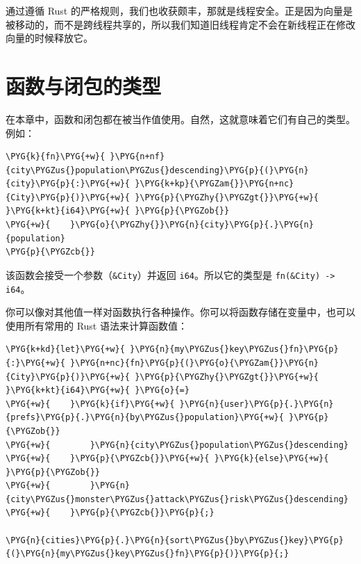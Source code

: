 通过遵循 Rust 的严格规则，我们也收获颇丰，那就是线程安全。正是因为向量是被移动的，而不是跨线程共享的，所以我们知道旧线程肯定不会在新线程正在修改向量的时候释放它。

\section{函数与闭包的类型}

在本章中，函数和闭包都在被当作值使用。自然，这就意味着它们有自己的类型。例如：

\begin{Verbatim}[commandchars=\\\{\},breaklines=true,breakanywhere=true,fontsize=\codefont,xleftmargin=17bp]
\PYG{k}{fn}\PYG{+w}{ }\PYG{n+nf}{city\PYGZus{}population\PYGZus{}descending}\PYG{p}{(}\PYG{n}{city}\PYG{p}{:}\PYG{+w}{ }\PYG{k+kp}{\PYGZam{}}\PYG{n+nc}{City}\PYG{p}{)}\PYG{+w}{ }\PYG{p}{\PYGZhy{}\PYGZgt{}}\PYG{+w}{ }\PYG{k+kt}{i64}\PYG{+w}{ }\PYG{p}{\PYGZob{}}
\PYG{+w}{    }\PYG{o}{\PYGZhy{}}\PYG{n}{city}\PYG{p}{.}\PYG{n}{population}
\PYG{p}{\PYGZcb{}}
\end{Verbatim}

该函数会接受一个参数（\texttt{\&City}）并返回 \texttt{i64}。所以它的类型是 \texttt{fn(\&City) -> i64}。

你可以像对其他值一样对函数执行各种操作。你可以将函数存储在变量中，也可以使用所有常用的 Rust 语法来计算函数值：

\begin{Verbatim}[commandchars=\\\{\},breaklines=true,breakanywhere=true,fontsize=\codefont,xleftmargin=17bp]
\PYG{k+kd}{let}\PYG{+w}{ }\PYG{n}{my\PYGZus{}key\PYGZus{}fn}\PYG{p}{:}\PYG{+w}{ }\PYG{n+nc}{fn}\PYG{p}{(}\PYG{o}{\PYGZam{}}\PYG{n}{City}\PYG{p}{)}\PYG{+w}{ }\PYG{p}{\PYGZhy{}\PYGZgt{}}\PYG{+w}{ }\PYG{k+kt}{i64}\PYG{+w}{ }\PYG{o}{=}
\PYG{+w}{    }\PYG{k}{if}\PYG{+w}{ }\PYG{n}{user}\PYG{p}{.}\PYG{n}{prefs}\PYG{p}{.}\PYG{n}{by\PYGZus{}population}\PYG{+w}{ }\PYG{p}{\PYGZob{}}
\PYG{+w}{        }\PYG{n}{city\PYGZus{}population\PYGZus{}descending}
\PYG{+w}{    }\PYG{p}{\PYGZcb{}}\PYG{+w}{ }\PYG{k}{else}\PYG{+w}{ }\PYG{p}{\PYGZob{}}
\PYG{+w}{        }\PYG{n}{city\PYGZus{}monster\PYGZus{}attack\PYGZus{}risk\PYGZus{}descending}
\PYG{+w}{    }\PYG{p}{\PYGZcb{}}\PYG{p}{;}

\PYG{n}{cities}\PYG{p}{.}\PYG{n}{sort\PYGZus{}by\PYGZus{}key}\PYG{p}{(}\PYG{n}{my\PYGZus{}key\PYGZus{}fn}\PYG{p}{)}\PYG{p}{;}
\end{Verbatim}

